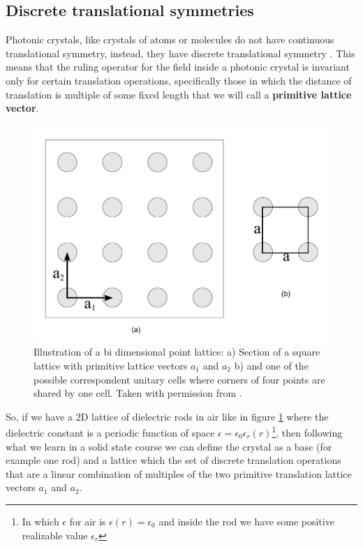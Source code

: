 \subsection{Discrete translational symmetries}
Photonic crystals, like crystals of atoms or molecules do not have continuous translational symmetry, instead, they have discrete translational symmetry \cite{Joannopoulos2008}. This means that the ruling operator for the field inside a photonic crystal is invariant only for certain translation operations, specifically those in which the distance of translation is multiple of some fixed length that we will call a \textbf{primitive lattice vector}.

\begin{figure}
\centering
\includegraphics[scale=1]{./img/squarel.pdf}
\caption{Illustration of a bi dimensional point lattice: a) Section of a square lattice with primitive lattice vectors $a_1$ and $a_2$ b)  and one of the possible correspondent unitary cells where corners of four points are shared by one cell. Taken with permission from \cite{Guarin2012}.}
\label{fig:sq_lat_fig}
\end{figure}

So, if we have a 2D lattice of dielectric rods in air like in figure \ref{fig:sq_lat_fig} where the dielectric constant is a periodic function of space $\epsilon = \epsilon_0\epsilon_r(r)$\footnote{In which $\epsilon$ for air is $\epsilon(r) = \epsilon_0$ and inside the rod we have some positive realizable value $\epsilon_r$}, then following what we learn in a solid state course we can define the crystal as a base (for example one rod) and a lattice which the set of discrete translation operations that are a linear combination of  multiples of the two primitive translation lattice vectors $a_1$ and $a_2$\cite{Kittel2005}.

